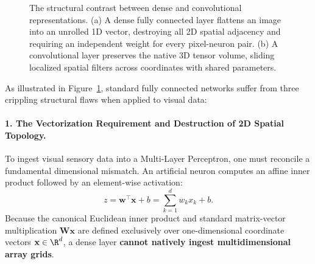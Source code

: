 \begin{figure}[H]
\begin{minipage}{0.48\linewidth}
\end{minipage}
\caption{The structural contrast between dense and convolutional representations. (a) A dense fully connected layer flattens an image into an unrolled 1D vector, destroying all 2D spatial adjacency and requiring an independent weight for every pixel-neuron pair. (b) A convolutional layer preserves the native 3D tensor volume, sliding localized spatial filters across coordinates with shared parameters.}
\label{fig:dense_vs_conv_geometry}
\end{figure}

As illustrated in Figure~\ref{fig:dense_vs_conv_geometry}, standard fully connected networks suffer from three crippling structural flaws when applied to visual data:

\paragraph{1. The Vectorization Requirement and Destruction of 2D Spatial Topology.}
To ingest visual sensory data into a Multi-Layer Perceptron, one must reconcile a fundamental dimensional mismatch. An artificial neuron computes an affine inner product followed by an element-wise activation:
\begin{equation}
z = \mathbf{w}^\top \mathbf{x} + b = \sum_{k=1}^d w_k x_k + b.
\end{equation}
Because the canonical Euclidean inner product and standard matrix-vector multiplication $\mathbf{W}\mathbf{x}$ are defined exclusively over one-dimensional coordinate vectors $\mathbf{x} \in \R^d$, a dense layer \textbf{cannot natively ingest multidimensional array grids}. 

